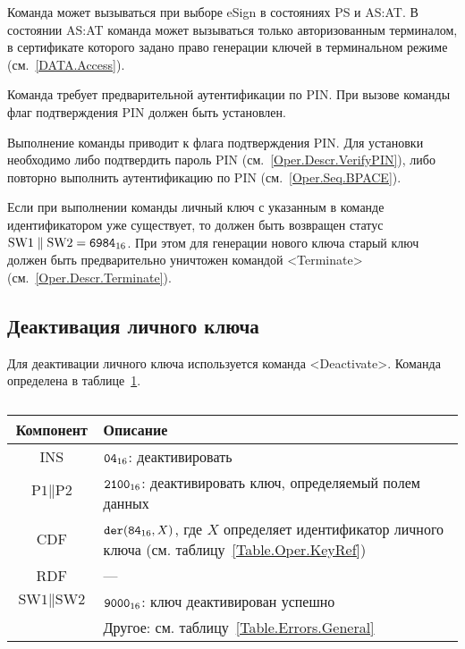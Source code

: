 Команда может вызываться при выборе eSign в состояниях 
PS и AS:AT. В состоянии AS:AT команда может вызываться 
только авторизованным терминалом, в сертификате которого задано право
генерации ключей в терминальном режиме (см.~\ref{DATA.Access}).

Команда требует предварительной аутентификации по PIN. При вызове
команды флаг подтверждения PIN должен быть установлен.

Выполнение команды приводит к  флага подтверждения PIN.
Для установки  необходимо либо подтвердить пароль PIN 
(см.~\ref{Oper.Descr.VerifyPIN}), либо повторно выполнить аутентификацию по PIN 
(см.~\ref{Oper.Seq.BPACE}). 

Если при выполнении команды личный ключ с указанным в команде идентификатором
уже существует, то должен быть возвращен статус 
$\text{SW1} \parallel \text{SW2} = \texttt{6984}_{16}$. 
При этом для генерации нового ключа старый ключ должен быть предварительно 
уничтожен командой <Terminate> (см.~\ref{Oper.Descr.Terminate}).

\subsection{Деактивация личного ключа}
\label{Oper.Descr.DeactivateKey} 

Для деактивации личного ключа используется команда <Deactivate>.
Команда определена в таблице~\ref{Table.Oper.DeactivateKeyCmd}.

\begin{table}[hbt]
\caption{}\label{Table.Oper.DeactivateKeyCmd}
\begin{tabular}{|c|p{14cm}|}
\hline
Компонент & Описание\\
\hline
\hline
INS & $\texttt{04}_{16}$: деактивировать\\
\hline
$\text{P1} \parallel \text{P2}$ & $\texttt{2100}_{16}$: 
деактивировать ключ, определяемый полем данных\\
\hline
CDF &  $\texttt{der}(\texttt{84}_{16}, X)$,   
где $X$ определяет идентификатор личного ключа 
(см. таблицу~\ref{Table.Oper.KeyRef})\\
\hline 
RDF & --- \\
\hline
$\text{SW1} \parallel \text{SW2}$ & 
$\texttt{9000}_{16}$: ключ деактивирован успешно \\
\cline{2-2}
  & Другое: см. таблицу~\ref{Table.Errors.General} \\
\hline
\end{tabular}
\end{table}

